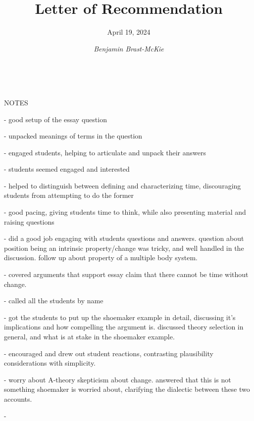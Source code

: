 \documentclass[a4paper, 11pt]{article} %
\title{\textbf{Letter of Recommendation}} %
\author{April 19, 2024} %
\date{\it Benjamin Brast-McKie} %
\makeatletter
\renewcommand{\maketitle}{ %
\begin{flushright}
{\large\@author} %
\\\@date %
\end{flushright}

\begin{flushleft} %
{\Large\@title} %
\end{flushleft}
}
\makeatother
\begin{document}
\maketitle %

\vspace{0pt} %

\noindent
NOTES

- good setup of the essay question

  - unpacked meanings of terms in the question

  - engaged students, helping to articulate and unpack their answers

  - students seemed engaged and interested

  - helped to distinguish between defining and characterizing time, discouraging students from attempting to do the former

  - good pacing, giving students time to think, while also presenting material and raising questions

  - did a good job engaging with students questions and answers. question about position being an intrinsic property/change was tricky, and well handled in the discussion. follow up about property of a multiple body system.

  - covered arguments that support essay claim that there cannot be time without change. 

  - called all the students by name

  - got the students to put up the shoemaker example in detail, discussing it's implications and how compelling the argument is. discussed theory selection in general, and what is at stake in the shoemaker example.

  - encouraged and drew out student reactions, contrasting plausibility considerations with simplicity.

  - worry about A-theory skepticism about change. answered that this is not something shoemaker is worried about, clarifying the dialectic between these two accounts.

  - 
\end{document}
